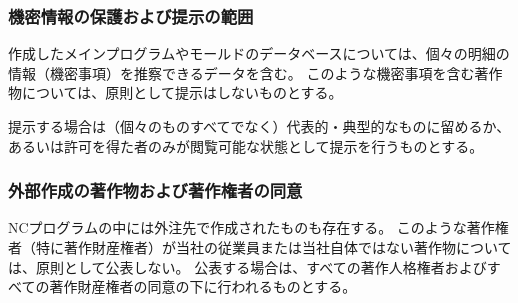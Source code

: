 \subsubsection{機密情報の保護および提示の範囲\label{subsec:notopenwork}}
作成したメインプログラムやモールドのデータベースについては、個々の明細の情報（機密事項）を推察できるデータを含む。
このような機密事項を含む著作物については、原則として提示はしないものとする。

提示する場合は（個々のものすべてでなく）代表的・典型的なものに留めるか、あるいは許可を得た者のみが閲覧可能な状態として提示を行うものとする。

\subsubsection{外部作成の著作物および著作権者の同意\label{subsec:standardscopyrightsSubcontractor}}
NCプログラムの中には外注先で作成されたものも存在する。
このような著作権者（特に著作財産権者）が当社の従業員または当社自体ではない著作物については、原則として公表しない。
公表する場合は、すべての著作人格権者およびすべての著作財産権者の同意の下に行われるものとする。



